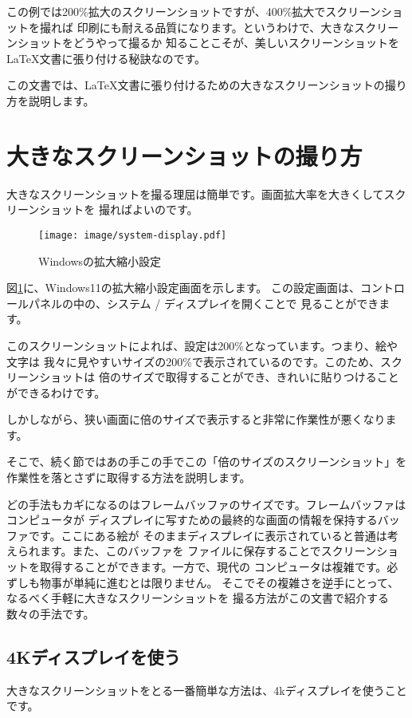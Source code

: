 この例では200\%拡大のスクリーンショットですが、400\%拡大でスクリーンショットを撮れば
印刷にも耐える品質になります。というわけで、大きなスクリーンショットをどうやって撮るか
知ることこそが、美しいスクリーンショットを\LaTeX 文書に張り付ける秘訣なのです。

この文書では、\LaTeX 文書に張り付けるための大きなスクリーンショットの撮り方を説明します。

\section{大きなスクリーンショットの撮り方}
大きなスクリーンショットを撮る理屈は簡単です。画面拡大率を大きくしてスクリーンショットを
撮ればよいのです。

\begin{figure}[btp]
  \begin{center}
    \texttt{[image: image/system-display.pdf]}
    \caption{Windowsの拡大縮小設定} \label{fig:system-display}
  \end{center}
\end{figure}

図\ref{fig:system-display}に、Windows11の拡大縮小設定画面を示します。
この設定画面は、コントロールパネルの中の、システム / ディスプレイを開くことで
見ることができます。

このスクリーンショットによれば、設定は200\%となっています。つまり、絵や文字は
我々に見やすいサイズの200\%で表示されているのです。このため、スクリーンショットは
倍のサイズで取得することができ、きれいに貼りつけることができるわけです。

しかしながら、狭い画面に倍のサイズで表示すると非常に作業性が悪くなります。

そこで、続く節ではあの手この手でこの「倍のサイズのスクリーンショット」を
作業性を落とさずに取得する方法を説明します。

どの手法もカギになるのはフレームバッファのサイズです。フレームバッファはコンピュータが
ディスプレイに写すための最終的な画面の情報を保持するバッファです。ここにある絵が
そのままディスプレイに表示されていると普通は考えられます。また、このバッファを
ファイルに保存することでスクリーンショットを取得することができます。一方で、現代の
コンピュータは複雑です。必ずしも物事が単純に進むとは限りません。
そこでその複雑さを逆手にとって、なるべく手軽に大きなスクリーンショットを
撮る方法がこの文書で紹介する数々の手法です。

\subsection{4Kディスプレイを使う}
大きなスクリーンショットをとる一番簡単な方法は、4kディスプレイを使うことです。

